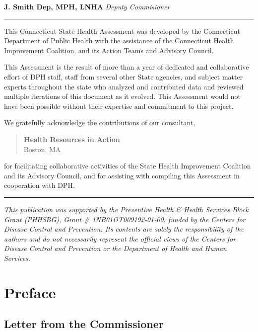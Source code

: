 \documentclass[
  letterpaper,
  DIV=11,
  numbers=noendperiod]{scrreprt}
\begin{document}
\textbf{J. Smith Dep, MPH, LNHA} \emph{Deputy Commisioner}

\begin{center}\rule{0.5\linewidth}{0.5pt}\end{center}

This Connecticut State Health Assessment was developed by the
Connecticut Department of Public Health with the assistance of the
Connecticut Health Improvement Coalition, and its Action Teams and
Advisory Council.

This Assessment is the result of more than a year of dedicated and
collaborative effort of DPH staff, staff from several other State
agencies, and subject matter experts throughout the state who analyzed
and contributed data and reviewed multiple iterations of this document
as it evolved. This Assessment would not have been possible without
their expertise and commitment to this project.

We gratefully acknowledge the contributions of our consultant,

\begin{quote}
\textbf{Health Resources in Action}\\
Boston, MA
\end{quote}

for facilitating collaborative activities of the State Health
Improvement Coalition and its Advisory Council, and for assisting with
compiling this Assessment in cooperation with DPH.

\begin{center}\rule{0.5\linewidth}{0.5pt}\end{center}

\emph{This publication was supported by the Preventive Health \& Health
Services Block Grant (PHHSBG), Grant \# 1NB01OT009192-01-00, funded by
the Centers for Disease Control and Prevention. Its contents are solely
the responsibility of the authors and do not necessarily represent the
official views of the Centers for Disease Control and Prevention or the
Department of Health and Human Services.}


\chapter*{Preface}\label{preface}


\section*{Letter from the
Commissioner}\label{letter-from-the-commissioner}
\end{document}
